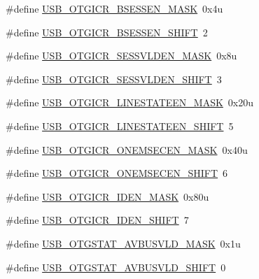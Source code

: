 \begin{DoxyCompactItemize}
\item 
\#define \hyperlink{group___u_s_b___register___masks_ga509dfbaf7a85ddbd9b7b61a1d5032cf1}{U\+S\+B\+\_\+\+O\+T\+G\+I\+C\+R\+\_\+\+B\+S\+E\+S\+S\+E\+N\+\_\+\+M\+A\+SK}~0x4u
\item 
\#define \hyperlink{group___u_s_b___register___masks_gad6d45208ed6411e439be457224176789}{U\+S\+B\+\_\+\+O\+T\+G\+I\+C\+R\+\_\+\+B\+S\+E\+S\+S\+E\+N\+\_\+\+S\+H\+I\+FT}~2
\item 
\#define \hyperlink{group___u_s_b___register___masks_ga35e32e6ed718719eb90a5aa7b8af10f3}{U\+S\+B\+\_\+\+O\+T\+G\+I\+C\+R\+\_\+\+S\+E\+S\+S\+V\+L\+D\+E\+N\+\_\+\+M\+A\+SK}~0x8u
\item 
\#define \hyperlink{group___u_s_b___register___masks_ga6f1a0dd83404b56be4be006b113f68d8}{U\+S\+B\+\_\+\+O\+T\+G\+I\+C\+R\+\_\+\+S\+E\+S\+S\+V\+L\+D\+E\+N\+\_\+\+S\+H\+I\+FT}~3
\item 
\#define \hyperlink{group___u_s_b___register___masks_gac9d12e9bdf0d60b52ea0b99c668630af}{U\+S\+B\+\_\+\+O\+T\+G\+I\+C\+R\+\_\+\+L\+I\+N\+E\+S\+T\+A\+T\+E\+E\+N\+\_\+\+M\+A\+SK}~0x20u
\item 
\#define \hyperlink{group___u_s_b___register___masks_ga1824eae0010a884c2b3bd425cfa2b389}{U\+S\+B\+\_\+\+O\+T\+G\+I\+C\+R\+\_\+\+L\+I\+N\+E\+S\+T\+A\+T\+E\+E\+N\+\_\+\+S\+H\+I\+FT}~5
\item 
\#define \hyperlink{group___u_s_b___register___masks_gac68531fd32d53520e1d1ccdd4cfae9ec}{U\+S\+B\+\_\+\+O\+T\+G\+I\+C\+R\+\_\+\+O\+N\+E\+M\+S\+E\+C\+E\+N\+\_\+\+M\+A\+SK}~0x40u
\item 
\#define \hyperlink{group___u_s_b___register___masks_ga29ccacd7b79d6d2df3b8743ccd1c467f}{U\+S\+B\+\_\+\+O\+T\+G\+I\+C\+R\+\_\+\+O\+N\+E\+M\+S\+E\+C\+E\+N\+\_\+\+S\+H\+I\+FT}~6
\item 
\#define \hyperlink{group___u_s_b___register___masks_gaa13997b88383cb1aec6f042ecdb94399}{U\+S\+B\+\_\+\+O\+T\+G\+I\+C\+R\+\_\+\+I\+D\+E\+N\+\_\+\+M\+A\+SK}~0x80u
\item 
\#define \hyperlink{group___u_s_b___register___masks_ga36d7ef200033a393e023ab06808f7129}{U\+S\+B\+\_\+\+O\+T\+G\+I\+C\+R\+\_\+\+I\+D\+E\+N\+\_\+\+S\+H\+I\+FT}~7
\item 
\#define \hyperlink{group___u_s_b___register___masks_gaad4e0319a6f42042472b52c8d1ec1c77}{U\+S\+B\+\_\+\+O\+T\+G\+S\+T\+A\+T\+\_\+\+A\+V\+B\+U\+S\+V\+L\+D\+\_\+\+M\+A\+SK}~0x1u
\item 
\#define \hyperlink{group___u_s_b___register___masks_ga66258b09ad8ec5462b8594ce5ac7384c}{U\+S\+B\+\_\+\+O\+T\+G\+S\+T\+A\+T\+\_\+\+A\+V\+B\+U\+S\+V\+L\+D\+\_\+\+S\+H\+I\+FT}~0

\end{DoxyCompactItemize}
